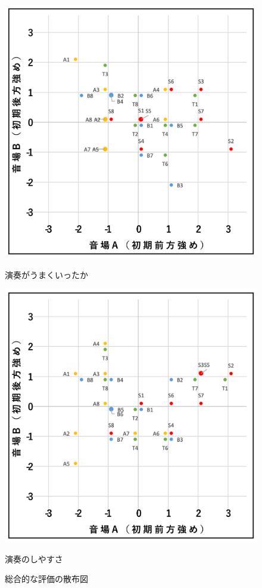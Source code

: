 \documentclass[11pt,a4j]{jreport}
\begin{document}
\begin{figure}[H]
  \begin{minipage}{0.5\linewidth}
    \centering
    \includegraphics[width=.9\linewidth]{images/subjectiveExp/scat_early_12wellDone.png}
    \caption*{演奏がうまくいったか}
  \end{minipage}%
  \begin{minipage}{0.5\linewidth}
    \centering
    \includegraphics[width=.9\linewidth]{images/subjectiveExp/scat_early_13easiness.png}
    \caption*{演奏のしやすさ}
  \end{minipage}

  \caption{総合的な評価の散布図}
  \label{fig:総合的な評価の散布図}
\end{figure}
\end{document}
